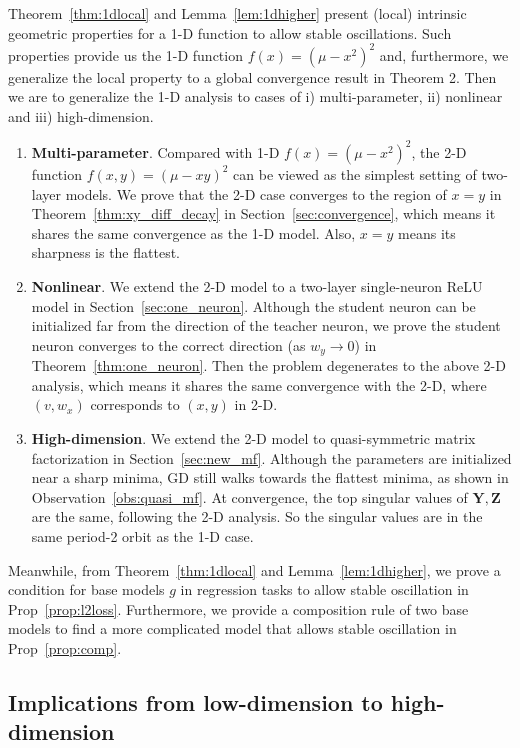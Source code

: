 \documentclass{article}
\theoremstyle{plain}
\theoremstyle{remark}
\begin{document}
Theorem~\ref{thm:1dlocal} and Lemma~\ref{lem:1dhigher} present (local) intrinsic geometric properties for a 1-D function to allow stable oscillations. Such properties provide us the 1-D function $f(x)=(\mu-x^2)^2$ and, furthermore, we generalize the local property to a global convergence result in Theorem 2. Then we are to generalize the 1-D analysis to cases of i) multi-parameter, ii) nonlinear and iii) high-dimension.

\begin{enumerate}[label=(\alph*)]
    \item \textbf{Multi-parameter}. Compared with 1-D $f(x)=(\mu-x^2)^2$, the 2-D function $f(x,y)=(\mu-xy)^2$ can be viewed as the simplest setting of two-layer models. We prove that the 2-D case converges to the region of $x=y$ in Theorem~\ref{thm:xy_diff_decay} in Section~\ref{sec:convergence}, which means it shares the same convergence as the 1-D model. Also, $x=y$ means its sharpness is the flattest.

    \item \textbf{Nonlinear}. We extend the 2-D model to a two-layer single-neuron ReLU model in Section~\ref{sec:one_neuron}. Although the student neuron can be initialized far from the direction of the teacher neuron, we prove the student neuron converges to the correct direction (as $w_y\rightarrow 0$) in Theorem~\ref{thm:one_neuron}. Then the problem degenerates to the above 2-D analysis, which means it shares the same convergence with the 2-D, where $(v,w_x)$ corresponds to $(x,y)$ in 2-D.

    \item \textbf{High-dimension}. We extend the 2-D model to quasi-symmetric matrix factorization in Section~\ref{sec:new_mf}. Although the parameters are initialized near a sharp minima, GD still walks towards the flattest minima, as shown in Observation~\ref{obs:quasi_mf}. At convergence, the top singular values of $\mathbf{Y}, \mathbf{Z}$ are the same, following the 2-D analysis. So the singular values are in the same period-2 orbit as the 1-D case.
\end{enumerate}

Meanwhile, from Theorem~\ref{thm:1dlocal} and Lemma~\ref{lem:1dhigher}, we prove a condition for base models $g$ in regression tasks to allow stable oscillation in Prop~\ref{prop:l2loss}. Furthermore, we provide a composition rule of two base models to find a more complicated model that allows stable oscillation in Prop~\ref{prop:comp}. 


\subsection{Implications from low-dimension to high-dimension} \label{app:implications}
\end{document}
